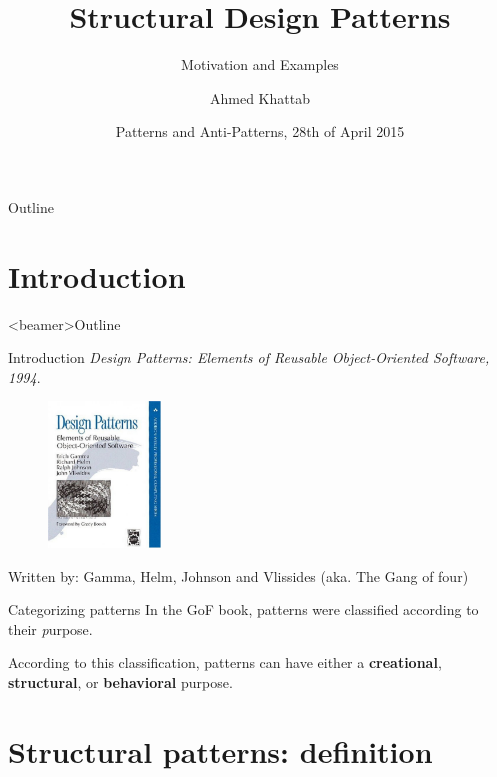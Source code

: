 \documentclass{beamer}
\title{Structural Design Patterns}
\subtitle{Motivation and Examples}
\author{Ahmed Khattab}
\institute[TUM]{Technische Universit{\"a}t M{\"u}nchen}
\date[28.04.2015]{Patterns and Anti-Patterns, 28th of April 2015}
\begin{document}
\begin{frame}
  \titlepage
\end{frame}

\begin{frame}{Outline}
  \tableofcontents
\end{frame}


\section{Introduction}
\begin{frame}<beamer>{Outline}
  \tableofcontents[currentsection]
\end{frame}

\begin{frame}{Introduction}%
\emph{Design Patterns: Elements of Reusable Object-Oriented Software, 1994}.\footnotemark
 \begin{figure}[htp]
    \centering
    \includegraphics[width=3cm]{pics/gof}
    \label{fig:gof}
    \end{figure}
Written by: Gamma, Helm, Johnson and Vlissides (aka. The Gang of four)

\end{frame}

\begin{frame}{Categorizing patterns}
In the GoF book, patterns were classified according to their \emph purpose.

According to this classification, patterns can have either a \textbf{creational}, \textbf{structural}, or \textbf{behavioral} purpose.
\end{frame}


\section{Structural patterns: definition}
\end{document}
